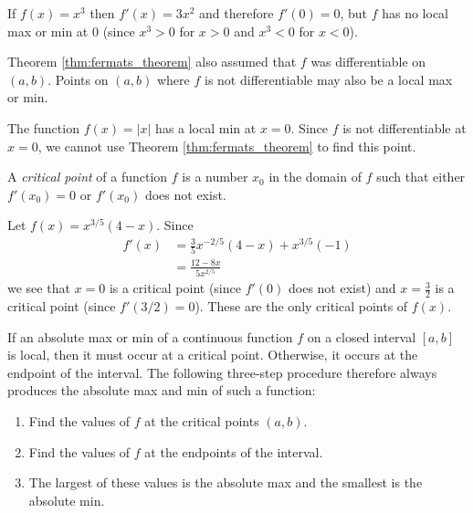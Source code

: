 \documentclass[12pt,letterpaper,reqno]{article}
\numberwithin{equation}{section}
\begin{document}
{\begin{example}
If $f(x)=x^3$ then $f'(x)=3x^2$ and therefore $f'(0)=0$, but $f$ has no local max or min at $0$ (since $x^3>0$ for $x>0$ and $x^3<0$ for $x<0$).	
\end{example}

Theorem \ref{thm:fermats_theorem} also assumed that $f$ was differentiable on $(a,b)$. Points on $(a,b)$ where $f$ is not differentiable may also be a local max or min.

\begin{example}
The function $f(x)=|x|$ has a local min at $x=0$. Since $f$ is not differentiable at $x=0$, we cannot use Theorem \ref{thm:fermats_theorem} to find this point.	
\end{example}

\begin{defn}
A \emph{critical point} of a function $f$ is a number $x_0$ in the domain of $f$ such that either $f'(x_0)=0$ or $f'(x_0)$ does not exist.	
\end{defn}

\begin{example}
Let $f(x)=x^{3/5}(4-x)$. Since
\begin{align*}
	f'(x)&=\frac{3}{5}x^{-2/5}(4-x)+x^{3/5}(-1) \\
	&=\frac{12-8x}{5x^{2/5}}
\end{align*}	
we see that $x=0$ is a critical point (since $f'(0)$ does not exist) and $x=\frac{3}{2}$ is a critical point (since $f'(3/2)=0$). These are the only critical points of $f(x)$.
\end{example}

If an absolute max or min of a continuous function $f$ on a closed interval $[a,b]$ is local, then it must occur at a critical point. Otherwise, it occurs at the endpoint of the interval. The following three-step procedure therefore always produces the absolute max and min of such a function:
\begin{enumerate}
	\item Find the values of $f$ at the critical points $(a,b)$.
	\item Find the values of $f$ at the endpoints of the interval.
	\item The largest of these values is the absolute max and the smallest is the absolute min.
\end{enumerate}

}
\end{document}
